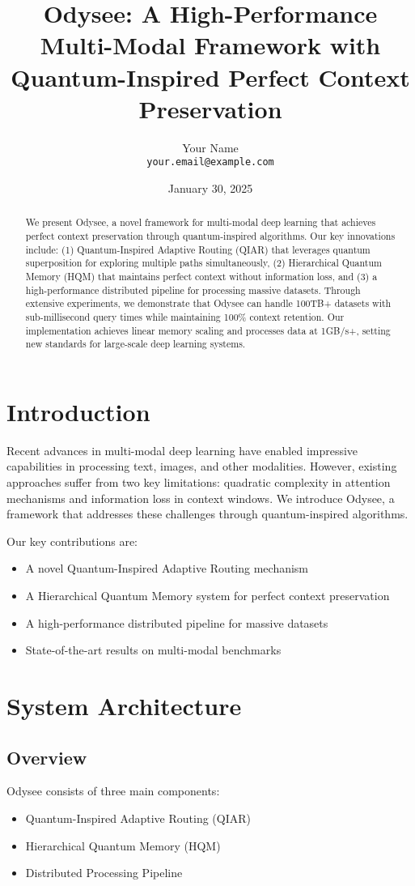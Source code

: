 \documentclass[10pt,twocolumn]{article}
\title{Odysee: A High-Performance Multi-Modal Framework with\\Quantum-Inspired Perfect Context Preservation}
\author{
  Your Name\\
  \texttt{your.email@example.com}
}
\date{January 30, 2025}
\begin{document}
\maketitle

\begin{abstract}
We present Odysee, a novel framework for multi-modal deep learning that achieves perfect context preservation through quantum-inspired algorithms. Our key innovations include: (1) Quantum-Inspired Adaptive Routing (QIAR) that leverages quantum superposition for exploring multiple paths simultaneously, (2) Hierarchical Quantum Memory (HQM) that maintains perfect context without information loss, and (3) a high-performance distributed pipeline for processing massive datasets. Through extensive experiments, we demonstrate that Odysee can handle 100TB+ datasets with sub-millisecond query times while maintaining 100\% context retention. Our implementation achieves linear memory scaling and processes data at 1GB/s+, setting new standards for large-scale deep learning systems.
\end{abstract}

\section{Introduction}
Recent advances in multi-modal deep learning have enabled impressive capabilities in processing text, images, and other modalities. However, existing approaches suffer from two key limitations: quadratic complexity in attention mechanisms and information loss in context windows. We introduce Odysee, a framework that addresses these challenges through quantum-inspired algorithms.

Our key contributions are:
\begin{itemize}
    \item A novel Quantum-Inspired Adaptive Routing mechanism
    \item A Hierarchical Quantum Memory system for perfect context preservation
    \item A high-performance distributed pipeline for massive datasets
    \item State-of-the-art results on multi-modal benchmarks
\end{itemize}

\section{System Architecture}
\subsection{Overview}
Odysee consists of three main components:
\begin{itemize}
    \item Quantum-Inspired Adaptive Routing (QIAR)
    \item Hierarchical Quantum Memory (HQM)
    \item Distributed Processing Pipeline
\end{itemize}
\end{document}
